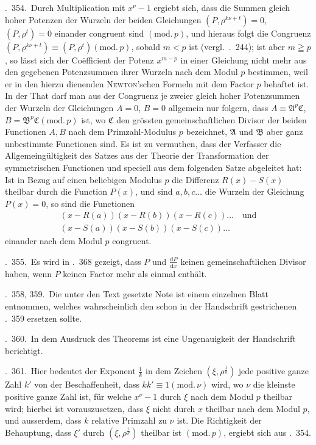 \textsection.\ 354.\ Durch Multiplication mit $x^\nu-1$ ergiebt sich, dass die Summen gleich hoher Potenzen der Wurzeln der beiden Gleichungen $(P,\rho^{k\nu+t})=0$, $(P,\rho^t)=0$ einander congruent sind $(\mathrm{mod.}\,p)$, und hieraus folgt die Congruenz $(P,\rho^{k\nu+t})\equiv(P,\rho^t)(\mathrm{mod.}\,p)$, sobald $m<p$ ist (vergl.\ \textsection.\ 244); ist aber $m\geqq p$, so lässt sich der Coëfficient der Potenz $x^{m-p}$ in einer Gleichung nicht mehr aus den gegebenen Potenzsummen ihrer Wurzeln nach dem Modul $p$ bestimmen, weil er in den hierzu dienenden \textsc{Newton}'schen Formeln mit dem Factor $p$ behaftet ist. In der That darf man aus der Congruenz je zweier gleich hoher Potenzsummen der Wurzeln der Gleichungen $A=0$, $B=0$ allgemein nur folgern, dass $A\equiv\mathfrak A^p\mathfrak C$, $B=\mathfrak B^p\mathfrak C(\mathrm{mod.}\,p)$ ist, wo $\mathfrak C$ den grössten gemeinschaftlichen Divisor der beiden Functionen $A,B$ nach dem Primzahl-Modulus $p$ bezeichnet, $\mathfrak A$ und $\mathfrak B$ aber ganz unbestimmte Functionen sind. Es ist zu vermuthen, dass der Verfasser die Allgemeingültigkeit des Satzes aus der Theorie der Transformation der symmetrischen Functionen und speciell aus dem folgenden Satze abgeleitet hat: Ist in Bezug auf einen beliebigen Modulus $p$ die Differenz $R(x)-S(x)$ theilbar durch die Function $P(x)$, und sind $a,b,c\ldots$ die Wurzeln der Gleichung $P(x)=0$, so sind die Functionen
\[
\begin{gathered}
(x-R(a))(x-R(b))(x-R(c))\ldots\quad\text{und}\\
(x-S(a))(x-S(b))(x-S(c))\ldots
\end{gathered}
\]
einander nach dem Modul $p$ congruent.

\textsection.\ 355.\ Es wird in \textsection.\ 368 gezeigt, dass $P$ und $\frac{\mathrm{d}P}{\mathrm{d}x}$ keinen gemeinschaftlichen Divisor haben, wenn $P$ keinen Factor mehr als einmal enthält.

\textsection\textsection.\ 358, 359.\ Die unter den Text gesetzte Note ist einem einzelnen Blatt entnommen, welches wahrscheinlich den schon in der Handschrift gestrichenen \textsection.\ 359 ersetzen sollte.

\textsection.\ 360.\ In dem Ausdruck des Theorems ist eine Ungenauigkeit der Handschrift berichtigt.

\textsection.\ 361.\ Hier bedeutet der Exponent $\frac1k$ in dem Zeichen $(\xi,\rho^{\frac1k})$ jede positive ganze Zahl $k'$ von der Beschaffenheit, dass $kk'\equiv1(\mathrm{mod.}\,\nu)$ wird, wo $\nu$ die kleinste positive ganze Zahl ist, für welche $x^\nu-1$ durch $\xi$ nach dem Modul $p$ theilbar wird; hierbei ist vorauszusetzen, dass $\xi$ nicht durch $x$ theilbar nach dem Modul $p$, und ausserdem, dass $k$ relative Primzahl zu $\nu$ ist. Die Richtigkeit der Behauptung, dass $\xi'$ durch $(\xi,\rho^{\frac1k})$ theilbar ist $(\mathrm{mod.}\,p)$, ergiebt sich aus \textsection.\ 354.

